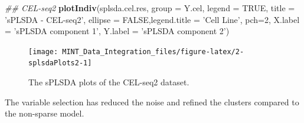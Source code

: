 \documentclass[]{book}
\newenvironment{Shaded}{\begin{snugshade}}{\end{snugshade}}
\newcommand{\CommentTok}[1]{\textcolor[rgb]{0.56,0.35,0.01}{\textit{#1}}}
\newcommand{\DataTypeTok}[1]{\textcolor[rgb]{0.13,0.29,0.53}{#1}}
\newcommand{\DecValTok}[1]{\textcolor[rgb]{0.00,0.00,0.81}{#1}}
\newcommand{\FloatTok}[1]{\textcolor[rgb]{0.00,0.00,0.81}{#1}}
\newcommand{\KeywordTok}[1]{\textcolor[rgb]{0.13,0.29,0.53}{\textbf{#1}}}
\newcommand{\NormalTok}[1]{#1}
\newcommand{\OperatorTok}[1]{\textcolor[rgb]{0.81,0.36,0.00}{\textbf{#1}}}
\newcommand{\OtherTok}[1]{\textcolor[rgb]{0.56,0.35,0.01}{#1}}
\newcommand{\StringTok}[1]{\textcolor[rgb]{0.31,0.60,0.02}{#1}}
\theoremstyle{definition}
\theoremstyle{definition}
\theoremstyle{definition}
\theoremstyle{remark}
\begin{document}
\begin{Shaded}
\begin{Highlighting}[]
\CommentTok{## CEL-seq2}
\KeywordTok{plotIndiv}\NormalTok{(splsda.cel.res, }\DataTypeTok{group =}\NormalTok{ Y.cel,}
          \DataTypeTok{legend  =} \OtherTok{TRUE}\NormalTok{, }\DataTypeTok{title     =} \StringTok{'sPLSDA - CEL-seq2'}\NormalTok{,}
          \DataTypeTok{ellipse =} \OtherTok{FALSE}\NormalTok{,}\DataTypeTok{legend.title =} \StringTok{'Cell Line'}\NormalTok{,}
          \DataTypeTok{pch=}\DecValTok{2}\NormalTok{,}
          \DataTypeTok{X.label =} \StringTok{'sPLSDA component 1'}\NormalTok{,}
          \DataTypeTok{Y.label =} \StringTok{'sPLSDA component 2'}\NormalTok{)}
\end{Highlighting}
\end{Shaded}

\begin{figure}[ht]

{\centering \texttt{[image: MINT\_Data\_Integration\_files/figure-latex/2-splsdaPlots2-1]} 

}

\caption{ The sPLSDA plots of the CEL-seq2 dataset.}\label{fig:2-splsdaPlots2}
\end{figure}

The variable selection has reduced the noise and refined the clusters
compared to the non-sparse model.

\begin{Shaded}
\end{Shaded}
\end{document}
